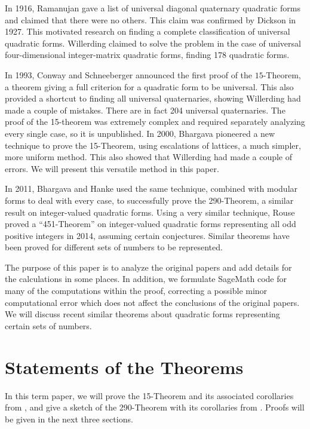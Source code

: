 \documentclass[letterpaper, 12pt]{article}
\begin{document}
In 1916, Ramanujan \cite{ramanujan1916diagonal} gave a list of universal diagonal quaternary quadratic forms and claimed that there were no others. This claim was confirmed by Dickson \cite{Dickson1927} in 1927. This motivated research on finding a complete classification of universal quadratic forms.
Willerding \cite{willerding1947} claimed to solve the problem in the case of universal four-dimensional integer-matrix quadratic forms, finding 178 quadratic forms.

In 1993, Conway and Schneeberger announced the first proof of the $15$-Theorem, a theorem giving a full criterion for a quadratic form to be universal. This also provided a shortcut to finding all universal quaternaries, showing Willerding had made a couple of mistakes. There are in fact 204 universal quaternaries.
The proof of the 15-theorem was extremely complex and required separately analyzing every single case, so it is unpublished.
In 2000, Bhargava \cite{fifteen} pioneered a new technique to prove the 15-Theorem, using escalations of lattices, a much simpler, more uniform method. This also showed that Willerding had made a couple of errors. We will present this versatile method in this paper.

In 2011, Bhargava and Hanke \cite{twoninety} used the same technique, combined with modular forms to deal with every case, to successfully prove the 290-Theorem, a similar result on integer-valued quadratic forms.
Using a very similar technique, Rouse proved a ``451-Theorem'' \cite{451} on integer-valued quadratic forms representing all odd positive integers in 2014, assuming certain conjectures. Similar theorems have been proved for different sets of numbers to be represented.

The purpose of this paper is to analyze the original papers and add details for the calculations in some places. In addition, we formulate SageMath code for many of the computations within the proof, correcting a possible minor computational error which does not affect the conclusions of the original papers. We will discuss recent similar theorems about quadratic forms representing certain sets of numbers.

\section{Statements of the Theorems}
In this term paper, we will prove the 15-Theorem and its associated corollaries from \cite{fifteen}, and give a sketch of the 290-Theorem with its corollaries from \cite{twoninety}. Proofs will be given in the next three sections.
\end{document}
